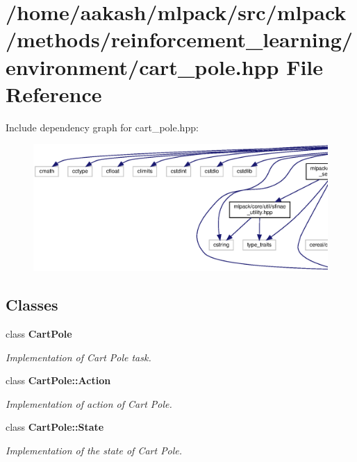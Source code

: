 \section{/home/aakash/mlpack/src/mlpack/methods/reinforcement\+\_\+learning/environment/cart\+\_\+pole.hpp File Reference}
\label{cart__pole_8hpp}
Include dependency graph for cart\+\_\+pole.\+hpp\+:
\nopagebreak
\begin{figure}[H]
\begin{center}
\leavevmode
\includegraphics[width=350pt]{cart__pole_8hpp__incl}
\end{center}
\end{figure}
\subsection*{Classes}
\begin{DoxyCompactItemize}
\item 
class \textbf{ Cart\+Pole}
\begin{DoxyCompactList}\small\item\em Implementation of Cart Pole task. \end{DoxyCompactList}\item 
class \textbf{ Cart\+Pole\+::\+Action}
\begin{DoxyCompactList}\small\item\em Implementation of action of Cart Pole. \end{DoxyCompactList}\item 
class \textbf{ Cart\+Pole\+::\+State}
\begin{DoxyCompactList}\small\item\em Implementation of the state of Cart Pole. \end{DoxyCompactList}\end{DoxyCompactItemize}
